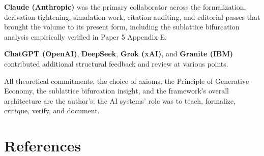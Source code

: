 \documentclass[11pt,oneside]{report}
\theoremstyle{definition}
\theoremstyle{remark}
\begin{document}
\textbf{Claude (Anthropic)} was the primary collaborator across the
formalization, derivation tightening, simulation work, citation
auditing, and editorial passes that brought the volume to its present
form, including the sublattice bifurcation analysis empirically verified
in Paper 5 Appendix E.

\textbf{ChatGPT (OpenAI)}, \textbf{DeepSeek}, \textbf{Grok (xAI)}, and
\textbf{Granite (IBM)} contributed additional structural feedback and
review at various points.

All theoretical commitments, the choice of axioms, the Principle of
Generative Economy, the sublattice bifurcation insight, and the
framework's overall architecture are the author's; the AI systems' role
was to teach, formalize, critique, verify, and document.

\section*{References}
\end{document}
